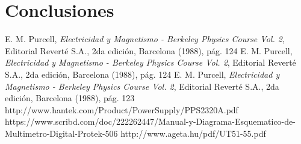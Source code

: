 \documentclass[twoside,twocolumn,a4paper]{article}
\begin{document}

\section{Conclusiones}



\begin{thebibliography}{99} %

 E. M. Purcell, \textit{Electricidad y Magnetismo - Berkeley Physics Course Vol. 2}, Editorial Revert\'e S.A., 2da edici\'on, Barcelona (1988), p\'ag. 124
 E. M. Purcell, \textit{Electricidad y Magnetismo - Berkeley Physics Course Vol. 2}, Editorial Revert\'e S.A., 2da edici\'on, Barcelona (1988), p\'ag. 124
 E. M. Purcell, \textit{Electricidad y Magnetismo - Berkeley Physics Course Vol. 2}, Editorial Revert\'e S.A., 2da edici\'on, Barcelona (1988), p\'ag. 123
 http://www.hantek.com/Product/PowerSupply/PPS2320A.pdf
 https://www.scribd.com/doc/222262447/Manual-y-Diagrama-Esquematico-de-Multimetro-Digital-Protek-506
 http://www.ageta.hu/pdf/UT51-55.pdf
 
\end{thebibliography}

\end{document}
